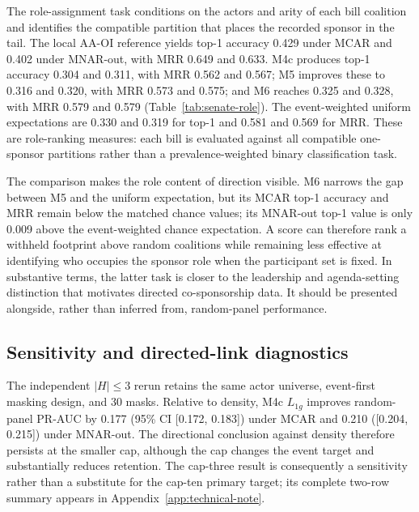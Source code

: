 \documentclass{nws}
\begin{document}
The role-assignment task conditions on the actors and arity of each bill coalition and identifies the compatible partition that places the recorded sponsor in the tail. The local AA-OI reference yields top-1 accuracy 0.429 under MCAR and 0.402 under MNAR-out, with MRR 0.649 and 0.633. M4c produces top-1 accuracy 0.304 and 0.311, with MRR 0.562 and 0.567; M5 improves these to 0.316 and 0.320, with MRR 0.573 and 0.575; and M6 reaches 0.325 and 0.328, with MRR 0.579 and 0.579 (Table~\ref{tab:senate-role}). The event-weighted uniform expectations are 0.330 and 0.319 for top-1 and 0.581 and 0.569 for MRR. These are role-ranking measures: each bill is evaluated against all compatible one-sponsor partitions rather than a prevalence-weighted binary classification task.

The comparison makes the role content of direction visible. M6 narrows the gap between M5 and the uniform expectation, but its MCAR top-1 accuracy and MRR remain below the matched chance values; its MNAR-out top-1 value is only 0.009 above the event-weighted chance expectation. A score can therefore rank a withheld footprint above random coalitions while remaining less effective at identifying who occupies the sponsor role when the participant set is fixed. In substantive terms, the latter task is closer to the leadership and agenda-setting distinction that motivates directed co-sponsorship data. It should be presented alongside, rather than inferred from, random-panel performance.



\subsection{Sensitivity and directed-link diagnostics}\label{sec:directed-link-results}

The independent $|H|\leq3$ rerun retains the same actor universe, event-first masking design, and 30 masks. Relative to density, M4c $L_{1g}$ improves random-panel PR-AUC by 0.177 (95\% CI [0.172, 0.183]) under MCAR and 0.210 ([0.204, 0.215]) under MNAR-out. The directional conclusion against density therefore persists at the smaller cap, although the cap changes the event target and substantially reduces retention. The cap-three result is consequently a sensitivity rather than a substitute for the cap-ten primary target; its complete two-row summary appears in Appendix~\ref{app:technical-note}.
\end{document}
